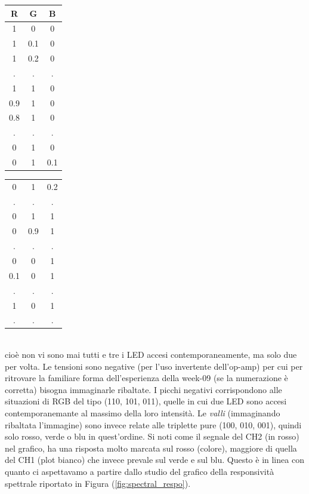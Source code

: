 \documentclass[10pt,letterpaper]{article}
\begin{document}
\begin{table}[h]
\centering
\begin{tabular}{c|c|c}
 \textbf{R} &\textbf{ G} & \textbf{B} \\ 
 \hline 1 & 0 & 0 \\ 
 1 & 0.1 & 0 \\ 
 1 & 0.2 & 0 \\ 
 . & . & . \\ 

 1 & 1 & 0 \\ 
 0.9 & 1 & 0 \\ 
 0.8 & 1 & 0 \\ 
 . & . & . \\ 
 0 & 1 & 0 \\ 
 0 & 1 & 0.1 \\
\end{tabular}
\quad
\begin{tabular}{c|c|c}

 0 & 1 & 0.2 \\ 
 . & . & . \\ 

 0 & 1 & 1 \\ 
 0 & 0.9 & 1 \\ 
 . & . & . \\ 
 0 & 0 & 1 \\ 
 0.1 & 0 & 1 \\ 
 . & . & . \\ 
 1 & 0 & 1 \\ 
 . & . & . \\ 
\hline 
\end{tabular} 
\end{table}
~\\

cioè non vi sono mai tutti e tre i LED accesi contemporaneamente, ma solo due per volta.  Le tensioni sono negative (per l'uso invertente dell'op-amp) per cui per ritrovare la familiare forma dell'esperienza della week-09 (se la numerazione è corretta) bisogna immaginarle ribaltate. I picchi negativi corrispondono alle situazioni di RGB del tipo (110, 101, 011), quelle in cui due LED sono accesi contemporanemante al massimo della loro intensità. Le \textit{valli} (immaginando ribaltata l'immagine) sono invece relate alle triplette pure (100, 010, 001), quindi solo rosso, verde o blu in quest'ordine. Si noti come il segnale del CH2 (in rosso) nel grafico, ha una risposta molto marcata sul rosso (colore), maggiore di quella del CH1 (plot bianco) che invece prevale sul verde e sul blu. Questo è in linea con quanto ci aspettavamo a partire dallo studio del grafico della responsività spettrale riportato in Figura (\ref{fig:spectral_respo}).\\
\end{document}
